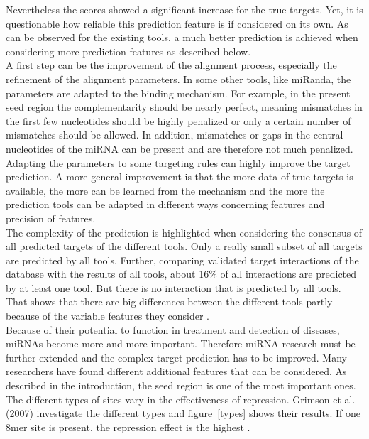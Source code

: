 \documentclass[11pt,  a4paper]{report}
\begin{document}
Nevertheless the scores showed a significant increase for the true targets. Yet, it is questionable how reliable this prediction feature is if considered on its own. As can be observed for the existing tools, a much better prediction is achieved when considering more prediction features as described below.\\

A first step can be the improvement of the alignment process, especially the refinement of the alignment parameters. In some other tools, like miRanda, the parameters are adapted to the binding mechanism. For example, in the present seed region the complementarity should be nearly perfect, meaning mismatches in the first few nucleotides should be highly penalized or only a certain number of mismatches should be allowed. In addition, mismatches or gaps in the central nucleotides of the miRNA can be present and are therefore not much penalized. Adapting the parameters to some targeting rules can highly improve the target prediction. A more general improvement is that the more data of true targets is available, the more can be learned from the mechanism and the more the prediction tools can be adapted in different ways concerning features and precision of features.\\

The complexity of the prediction is highlighted when considering the consensus of all predicted targets of the different tools. Only a really small subset of all targets are predicted by all tools. Further, comparing validated target interactions of the database with the results of all tools, about 16\% of all interactions are predicted by at least one tool. But there is no interaction that is predicted by all tools. That shows that there are big differences between the different tools partly because of the variable features they consider \cite{Keller}.\\ 

Because of their potential to function in treatment and detection of diseases, miRNAs become more and more important. Therefore miRNA research must be further extended and the complex target prediction has to be improved. Many researchers have found different additional features that can be considered. As described in the introduction, the seed region is one of the most important ones. The different types of sites vary in the effectiveness of repression. Grimson et al. (2007) investigate the different types and figure~\ref{types} shows their results. If one 8mer site is present, the repression effect is the highest \cite{Grimson}. \\
\end{document}
